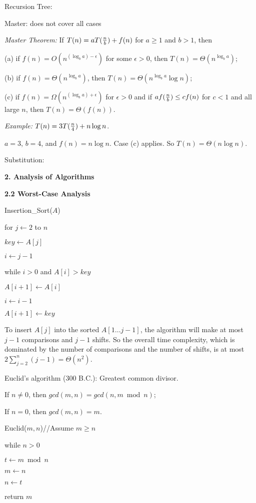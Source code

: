 \documentclass[8pt]{minimal}
\begin{document}
\begin{flushleft}
\begin{multicols}{3}
Recursion Tree:

Master: does not cover all cases

{\em Master Theorem:} If $T(n)=aT({n\over b})+f(n)$ for $a\ge1$ and $b>1$, then

(a) if $f(n)=O(n^{(\log_ba)-\epsilon})$ for some $\epsilon>0$, then
$T(n)=\Theta(n^{\log_ba})$;

(b) if $f(n)=\Theta(n^{\log_ba})$, then
$T(n)=\Theta(n^{\log_ba}\log n)$;

(c) if $f(n)=\Omega(n^{(\log_ba)+\epsilon})$ for $\epsilon>0$ and if
$af({n\over b})\le cf(n)$ for $c<1$ and all large $n$, then
$T(n)=\Theta(f(n))$.


{\em Example:} $T(n)=3T({n\over4})+n\log n$.

$a=3$, $b=4$, and $f(n)=n\log n$.
Case (c) applies. So $T(n)=\Theta(n\log n)$.

Substitution:


    \textbf{2. Analysis of Algorithms}


    \textbf{2.2 Worst-Case Analysis}
    
Insertion\_Sort($A$)
\par\quad for $j\leftarrow 2$ to $n$
\par\quad\quad $key\leftarrow A[j]$
\par\quad\quad $i\leftarrow j-1$
\par\quad\quad while $i>0$ and $A[i]>key$
\par\quad\quad\quad $A[i+1]\leftarrow A[i]$
\par\quad\quad\quad $i\leftarrow i-1$
\par\quad\quad $A[i+1]\leftarrow key$

To insert $A[j]$ into the sorted $A[1\ldots j-1]$, the algorithm
will make at most $j-1$ comparisons and $j-1$ shifts. So the overall 
time complexity,
which is dominated by the number of comparisons and the number of
shifts, is at most $2\sum_{j=2}^n(j-1)
=\Theta(n^2)$.



Euclid's algorithm (300 B.C.): Greatest common divisor.

If $n\not=0$, then $gcd(m,n)=gcd(n, m \bmod n)$;

If $n=0$, then $gcd(m,n)=m$.

Euclid($m,n$)\qquad //Assume $m\ge n$
\par\quad while $n>0$
\par\quad\quad $t\leftarrow m\bmod n$
\par\quad\quad $m\leftarrow n$
\par\quad\quad $n\leftarrow t$
\par\quad return $m$


\end{multicols}
\end{flushleft}
\end{document}
